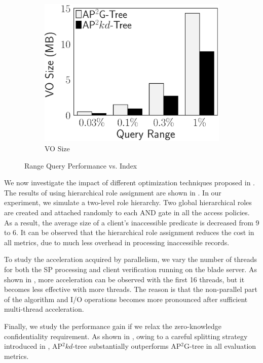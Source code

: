 \begin{figure}[t]
\begin{subfigure}{.33\linewidth}
        \includegraphics[height=\ht\figbox]{exp-figs/access-control/index_1_vo.eps}
        \caption{VO Size}
    \end{subfigure}
    \caption{Range Query Performance vs. Index}\label{exp-fig:access-control:index}
\end{figure}

We now investigate the impact of different optimization techniques proposed in . The results of using hierarchical role assignment are shown in . In our experiment, we simulate a two-level role hierarchy. Two global hierarchical roles are created and attached randomly to each AND gate in all the access policies. As a result, the average size of a client's inaccessible predicate is decreased from 9 to 6. It can be observed that the hierarchical role assignment reduces the cost in all metrics, due to much less overhead in processing inaccessible records.

To study the acceleration acquired by parallelism, we vary the number of threads for both the SP processing and client verification running on the blade server. As shown in , more acceleration can be observed with the first 16 threads, but it becomes less effective with more threads. The reason is that the non-parallel part of the algorithm and I/O operations becomes more pronounced after sufficient multi-thread acceleration.

Finally, we study the performance gain if we relax the zero-knowledge confidentiality requirement. As shown in , owing to a careful splitting strategy introduced in , AP$^2kd$-tree substantially outperforms AP$^2$G-tree in all evaluation metrics.

